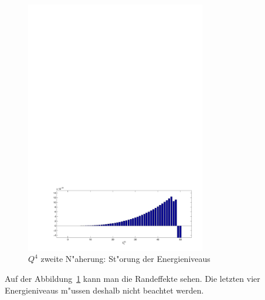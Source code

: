 \begin{refsection}
\begin{figure}	%
\centering
\includegraphics[width=0.7\textwidth]{anharmonisch/images/x4/EK2.pdf}
\caption{$Q^4$ zweite N"aherung: St"orung der Energieniveaus  
\label{skript:x4_EK2}}
\end{figure}

Auf der Abbildung~\ref{skript:x4_EK2} kann man die Randeffekte sehen.
Die letzten vier Energieniveaus m"ussen deshalb nicht beachtet werden.


\end{refsection}
